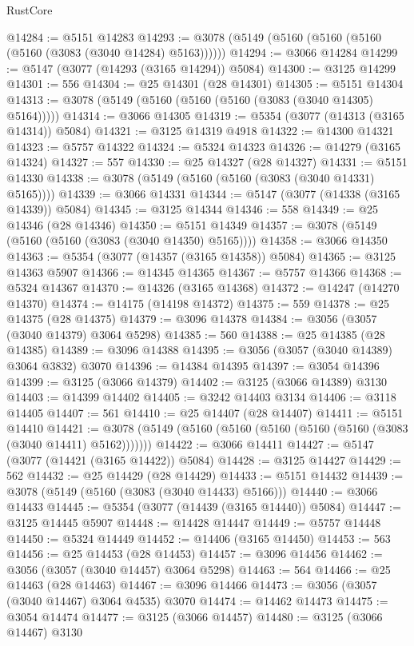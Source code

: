 \begin{lexlean}{RustCore}
\begin{coremodule}
@14284 := @5151 @14283
@14293 := @3078 (@5149 (@5160 (@5160 (@5160 (@5160 (@3083 (@3040 @14284) @5163))))))
@14294 := @3066 @14284
@14299 := @5147 (@3077 (@14293 (@3165 @14294)) @5084)
@14300 := @3125 @14299
@14301 := 556
@14304 := @25 @14301 (@28 @14301)
@14305 := @5151 @14304
@14313 := @3078 (@5149 (@5160 (@5160 (@5160 (@3083 (@3040 @14305) @5164)))))
@14314 := @3066 @14305
@14319 := @5354 (@3077 (@14313 (@3165 @14314)) @5084)
@14321 := @3125 @14319 @4918
@14322 := @14300 @14321
@14323 := @5757 @14322
@14324 := @5324 @14323
@14326 := @14279 (@3165 @14324)
@14327 := 557
@14330 := @25 @14327 (@28 @14327)
@14331 := @5151 @14330
@14338 := @3078 (@5149 (@5160 (@5160 (@3083 (@3040 @14331) @5165))))
@14339 := @3066 @14331
@14344 := @5147 (@3077 (@14338 (@3165 @14339)) @5084)
@14345 := @3125 @14344
@14346 := 558
@14349 := @25 @14346 (@28 @14346)
@14350 := @5151 @14349
@14357 := @3078 (@5149 (@5160 (@5160 (@3083 (@3040 @14350) @5165))))
@14358 := @3066 @14350
@14363 := @5354 (@3077 (@14357 (@3165 @14358)) @5084)
@14365 := @3125 @14363 @5907
@14366 := @14345 @14365
@14367 := @5757 @14366
@14368 := @5324 @14367
@14370 := @14326 (@3165 @14368)
@14372 := @14247 (@14270 @14370)
@14374 := @14175 (@14198 @14372)
@14375 := 559
@14378 := @25 @14375 (@28 @14375)
@14379 := @3096 @14378
@14384 := @3056 (@3057 (@3040 @14379) @3064 @5298)
@14385 := 560
@14388 := @25 @14385 (@28 @14385)
@14389 := @3096 @14388
@14395 := @3056 (@3057 (@3040 @14389) @3064 @3832) @3070
@14396 := @14384 @14395
@14397 := @3054 @14396
@14399 := @3125 (@3066 @14379)
@14402 := @3125 (@3066 @14389) @3130
@14403 := @14399 @14402
@14405 := @3242 @14403 @3134
@14406 := @3118 @14405
@14407 := 561
@14410 := @25 @14407 (@28 @14407)
@14411 := @5151 @14410
@14421 := @3078 (@5149 (@5160 (@5160 (@5160 (@5160 (@5160 (@3083 (@3040 @14411) @5162)))))))
@14422 := @3066 @14411
@14427 := @5147 (@3077 (@14421 (@3165 @14422)) @5084)
@14428 := @3125 @14427
@14429 := 562
@14432 := @25 @14429 (@28 @14429)
@14433 := @5151 @14432
@14439 := @3078 (@5149 (@5160 (@3083 (@3040 @14433) @5166)))
@14440 := @3066 @14433
@14445 := @5354 (@3077 (@14439 (@3165 @14440)) @5084)
@14447 := @3125 @14445 @5907
@14448 := @14428 @14447
@14449 := @5757 @14448
@14450 := @5324 @14449
@14452 := @14406 (@3165 @14450)
@14453 := 563
@14456 := @25 @14453 (@28 @14453)
@14457 := @3096 @14456
@14462 := @3056 (@3057 (@3040 @14457) @3064 @5298)
@14463 := 564
@14466 := @25 @14463 (@28 @14463)
@14467 := @3096 @14466
@14473 := @3056 (@3057 (@3040 @14467) @3064 @4535) @3070
@14474 := @14462 @14473
@14475 := @3054 @14474
@14477 := @3125 (@3066 @14457)
@14480 := @3125 (@3066 @14467) @3130

\end{coremodule}
\end{lexlean}

